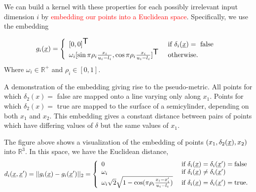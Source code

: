 \documentclass[landscape,a0b,final,a4resizeable]{include/a0poster}
\newcommand{\vect}[1]{\underline{\smash{#1}}}
\renewcommand{\v}[1]{\vect{#1}}
\newcommand{\reals}{\mathds{R}}
\newcommand{\sX}{\mathcal{X}}
\newcommand{\br}{}%
\newcommand\transpose{{\textrm{\tiny{\sf{T}}}}}
\newcommand{\embeddingletter}{g}
\begin{document}
\begin{poster}
\begin{multicols}{3}
\newpage 
{}

We can build a kernel with these properties for each possibly irrelevant input dimension $i$ by {\textcolor{red}{embedding our points into a Euclidean space}}.  Specifically, we use the embedding
%
%
%

\begin{equation}
\embeddingletter_i\br(\v{x}) = \left\{\begin{array}{ll}
[0,0]^\transpose & \textrm{ if } \delta_i(\v{x}) = \textrm{ false }\\
\omega_i [\sin{\pi\rho_i\frac{x_i}{u_i-l_i}}, \cos{\pi\rho_i\frac{x_i}{u_i-l_i}}]^\transpose & \textrm{ otherwise.}\end{array}\right.
\label{eq:embedding}
\end{equation}
Where $\omega_i \in \mathbb{R}^+$ and $\rho_i \in [0,1]$.
%


\centering
\label{fig:cylinder}

A demonstration of the embedding giving rise to the pseudo-metric.  All points for which $\delta_2(x) =$ false are mapped onto a line varying only along $x_1$.  Points for which $\delta_2(x) =$ true are mapped to the surface of a semicylinder, depending on both $x_1$ and $x_2$.  This embedding gives a constant distance between pairs of points which have differing values of $\delta$ but the same values of $x_1$.


The figure above
shows a visualization of the embedding of points $(x_1, \delta_2(\v{x}), x_2)$ into $\reals^3$. 
%
In this space, we have the Euclidean distance,
%
\begin{equation}
d\br_i(\v{x}, \v{x}') = ||\embeddingletter_i\br(\v{x})-\embeddingletter_i\br(\v{x}')||_2 =\left\{\begin{array}{ll}
0 & \textrm{ if } \delta_i(\v{x}) = \delta_i(\v{x}') = \textrm{false}\\
\omega_i & \textrm{ if } \delta_i(\v{x}) \neq \delta_i(\v{x}')\\
\omega_i \sqrt{2} \sqrt{1 - \cos(\pi\rho_i \frac{x_i-x_i'}{u_i-l_i})} & \textrm{ if } \delta_i(\v{x}) = \delta_i(\v{x}') = \textrm{true}. \end{array}\right.
\label{eq:distance}
\end{equation}


\end{multicols}
\end{poster}
\end{document}
